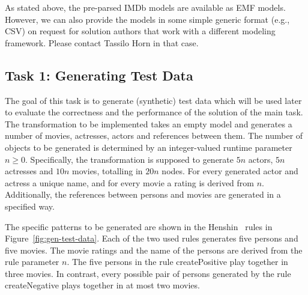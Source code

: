 \documentclass[a4paper,11pt]{article}
\begin{document}
As stated above, the pre-parsed IMDb models are available as EMF models.
However, we can also provide the models in some simple generic format (e.g.,
CSV) on request for solution authors that work with a different modeling
framework.  Please contact Tassilo Horn in that case.


\subsection{Task 1: Generating Test Data}
\label{sec:gen-test-data}


The goal of this task is to generate (synthetic) test data which will be used
later to evaluate the correctness and the performance of the solution of the 
main task. The transformation to be implemented takes an empty model and 
generates a number of movies, actresses, actors and references between them.
The number of objects to be generated is determined by an integer-valued 
runtime parameter $n\geq0$. Specifically, the transformation is supposed
to generate $5n$ actors, $5n$ actresses and $10n$ movies, totalling in 
$20n$ nodes. For every generated actor and actress a unique name, and for 
every movie a rating is derived from $n$. Additionally, the references between
persons and movies are generated in a specified way.

The specific patterns to be generated are shown in the Henshin~\cite{ABJ+10}
rules in Figure~\ref{fig:gen-test-data}.  Each of the two used rules generates
five persons and five movies. The movie ratings and the name of the persons are
derived from the rule parameter $n$.  The five persons in the rule
\textsf{createPositive} play together in three movies.  In contrast, every
possible pair of persons generated by the rule \textsf{createNegative} plays
together in at most two movies.
\end{document}
